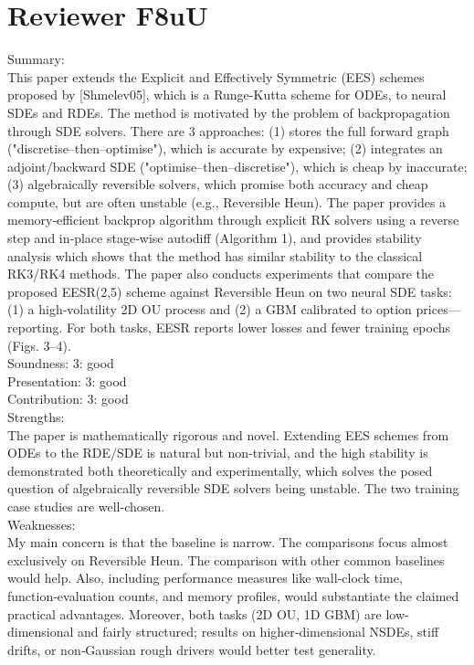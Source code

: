 \documentclass{article}
\begin{document}
\section{Reviewer F8uU}

Summary:\\
This paper extends the Explicit and Effectively Symmetric (EES) schemes proposed by [Shmelev05], which is a Runge-Kutta scheme for ODEs, to neural SDEs and RDEs. The method is motivated by the problem of backpropagation through SDE solvers. There are 3 approaches: (1) stores the full forward graph ("discretise–then–optimise"), which is accurate by expensive; (2) integrates an adjoint/backward SDE ("optimise–then–discretise"), which is cheap by inaccurate; (3) algebraically reversible solvers, which promise both accuracy and cheap compute, but are often unstable (e.g., Reversible Heun). The paper provides a memory‑efficient backprop algorithm through explicit RK solvers using a reverse step and in‑place stage‑wise autodiff (Algorithm 1), and provides stability analysis which shows that the method has similar stability to the classical RK3/RK4 methods. The paper also conducts experiments that compare the proposed EESR(2,5) scheme against Reversible Heun on two neural SDE tasks: (1) a high‑volatility 2D OU process and (2) a GBM calibrated to option prices—reporting. For both tasks, EESR reports lower losses and fewer training epochs (Figs. 3–4).\\

Soundness: 3: good\\
Presentation: 3: good\\
Contribution: 3: good\\
Strengths:\\
The paper is mathematically rigorous and novel. Extending EES schemes from ODEs to the RDE/SDE is natural but non‑trivial, and the high stability is demonstrated both theoretically and experimentally, which solves the posed question of algebraically reversible SDE solvers being unstable. The two training case studies are well-chosen.\\

Weaknesses:\\
My main concern is that the baseline is narrow. The comparisons focus almost exclusively on Reversible Heun. The comparison with other common baselines would help. Also, including performance measures like wall‑clock time, function‑evaluation counts, and memory profiles, would substantiate the claimed practical advantages. Moreover, both tasks (2D OU, 1D GBM) are low-dimensional and fairly structured; results on higher‑dimensional NSDEs, stiff drifts, or non‑Gaussian rough drivers would better test generality.\\
\end{document}
